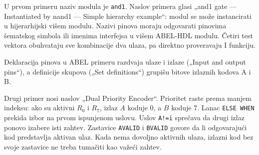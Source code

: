 U prvom primeru naziv modula je \texttt{and1}. Naslov primera glasi „and1 gate — Instantiated by nand1 — Simple hierarchy example“: modul se može instancirati u hijerarhijski višem modulu. Nazivi pinova moraju odgovarati pinovima šematskog simbola ili imenima interfejsa u višem ABEL-HDL modulu. Četiri test vektora obuhvataju sve kombinacije dva ulaza, pa direktno proveravaju I funkciju.

Deklaracija pinova u ABEL primeru razdvaja ulaze i izlaze („Input and output pins“), a definicije skupova („Set definitions“) grupišu bitove izlaznih kodova A i B.

Drugi primer nosi naslov „Dual Priority Encoder“. Prioritet raste prema manjem indeksu: ako su aktivni \(R_0\) i \(R_7\), izlaz \(A\) koduje 0, a \(B\) koduje 7. Lanac \texttt{ELSE WHEN} prekida izbor na prvom ispunjenom uslovu. Uslov \texttt{A!=i} sprečava da drugi izlaz ponovo izabere isti zahtev. Zastavice \texttt{AVALID} i \texttt{BVALID} govore da li odgovarajući kod predstavlja aktivan ulaz. Kada nema dovoljno aktivnih ulaza, izlazni kod bez svoje zastavice ne treba tumačiti kao važeći zahtev.
